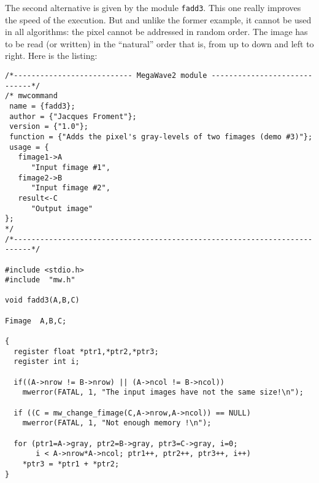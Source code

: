 \medskip

The second alternative is given by the module \verb+fadd3+.
This one really improves the speed of the execution.
But and unlike the former example, it cannot be used in all algorithms: the
pixel cannot be addressed in random order.
The image has to be read (or written) in the ``natural'' order that is,
from up to down and left to right.
Here is the listing:
{\small
\label{listing_fadd3}
\begin{verbatim}
/*--------------------------- MegaWave2 module -----------------------------*/
/* mwcommand
 name = {fadd3};
 author = {"Jacques Froment"};
 version = {"1.0"};
 function = {"Adds the pixel's gray-levels of two fimages (demo #3)"};
 usage = {
   fimage1->A 
      "Input fimage #1", 
   fimage2->B
      "Input fimage #2", 
   result<-C
      "Output image"
};
*/
/*--------------------------------------------------------------------------*/

#include <stdio.h>
#include  "mw.h"

void fadd3(A,B,C)

Fimage  A,B,C;

{
  register float *ptr1,*ptr2,*ptr3;
  register int i;

  if((A->nrow != B->nrow) || (A->ncol != B->ncol))
    mwerror(FATAL, 1, "The input images have not the same size!\n");

  if ((C = mw_change_fimage(C,A->nrow,A->ncol)) == NULL)
    mwerror(FATAL, 1, "Not enough memory !\n");  

  for (ptr1=A->gray, ptr2=B->gray, ptr3=C->gray, i=0;
       i < A->nrow*A->ncol; ptr1++, ptr2++, ptr3++, i++)
    *ptr3 = *ptr1 + *ptr2;
}
\end{verbatim}
}

\medskip

